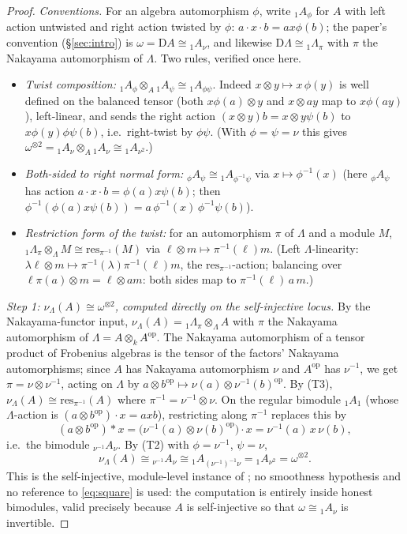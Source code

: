 \documentclass[11pt]{amsart}
\theoremstyle{definition}
\newcommand{\D}{\mathrm{D}}
\newcommand{\kk}{k}
\begin{document}
\begin{proof}
\emph{Conventions.} For an algebra automorphism $\phi$, write ${}_1A_\phi$ for
$A$ with left action untwisted and right action twisted by $\phi$:
$a\cdot x\cdot b=ax\phi(b)$; the paper's convention (\S\ref{sec:intro}) is
$\omega=\D A\cong{}_1A_\nu$, and likewise $\D\Lambda\cong{}_1\Lambda_\pi$ with
$\pi$ the Nakayama automorphism of $\Lambda$. Two rules, verified once here.
\begin{itemize}
\item[\textup{(T1)}] \emph{Twist composition:}
${}_1A_\phi\otimes_A{}_1A_\psi\cong{}_1A_{\phi\psi}$. Indeed
$x\otimes y\mapsto x\,\phi(y)$ is well defined on the balanced tensor
(both $x\phi(a)\otimes y$ and $x\otimes ay$ map to $x\phi(ay)$),
left-linear, and sends the right action $(x\otimes y)b=x\otimes y\psi(b)$ to
$x\phi(y)\phi\psi(b)$, i.e.\ right-twist by $\phi\psi$. (With $\phi=\psi=\nu$
this gives $\omega^{\otimes2}={}_1A_\nu\otimes_A{}_1A_\nu\cong{}_1A_{\nu^2}$.)
\item[\textup{(T2)}] \emph{Both-sided to right normal form:}
${}_\phi A_\psi\cong{}_1A_{\phi^{-1}\psi}$ via $x\mapsto\phi^{-1}(x)$
(here ${}_\phi A_\psi$ has action $a\cdot x\cdot b=\phi(a)x\psi(b)$; then
$\phi^{-1}(\phi(a)x\psi(b))=a\,\phi^{-1}(x)\,\phi^{-1}\psi(b)$).
\item[\textup{(T3)}] \emph{Restriction form of the twist:} for an automorphism
$\pi$ of $\Lambda$ and a module $M$, ${}_1\Lambda_\pi\otimes_\Lambda M\cong
\mathrm{res}_{\pi^{-1}}(M)$ via $\ell\otimes m\mapsto\pi^{-1}(\ell)m$. (Left
$\Lambda$-linearity: $\lambda\ell\otimes m\mapsto\pi^{-1}(\lambda)\pi^{-1}(\ell)m$,
the $\mathrm{res}_{\pi^{-1}}$-action; balancing over $\ell\pi(a)\otimes m=
\ell\otimes am$: both sides map to $\pi^{-1}(\ell)\,a\,m$.)
\end{itemize}

\emph{Step 1: $\nu_\Lambda(A)\cong\omega^{\otimes2}$, computed directly on the
self-injective locus.} By the Nakayama-functor input,
$\nu_\Lambda(A)={}_1\Lambda_\pi\otimes_\Lambda A$ with $\pi$ the Nakayama
automorphism of $\Lambda=A\otimes_\kk A^{\mathrm{op}}$. The Nakayama
automorphism of a tensor product of Frobenius algebras is the tensor of the
factors' Nakayama automorphisms; since $A$ has Nakayama automorphism $\nu$ and
$A^{\mathrm{op}}$ has $\nu^{-1}$, we get $\pi=\nu\otimes\nu^{-1}$, acting on
$\Lambda$ by $a\otimes b^{\mathrm{op}}\mapsto\nu(a)\otimes\nu^{-1}(b)^{\mathrm{op}}$.
By (T3), $\nu_\Lambda(A)\cong\mathrm{res}_{\pi^{-1}}(A)$ where
$\pi^{-1}=\nu^{-1}\otimes\nu$. On the regular bimodule ${}_1A_1$ (whose
$\Lambda$-action is $(a\otimes b^{\mathrm{op}})\cdot x=axb$), restricting along
$\pi^{-1}$ replaces this by
\[
(a\otimes b^{\mathrm{op}})\ast x
=\bigl(\nu^{-1}(a)\otimes\nu(b)^{\mathrm{op}}\bigr)\cdot x
=\nu^{-1}(a)\,x\,\nu(b),
\]
i.e.\ the bimodule ${}_{\nu^{-1}}A_{\nu}$. By (T2) with $\phi=\nu^{-1}$,
$\psi=\nu$,
\[
\nu_\Lambda(A)\cong{}_{\nu^{-1}}A_{\nu}\cong{}_1A_{(\nu^{-1})^{-1}\nu}
={}_1A_{\nu^2}=\omega^{\otimes2}.
\]
This is the self-injective, module-level instance of \cite[Theorem 3.2(4)]{ArmTau};
no smoothness hypothesis and no reference to \eqref{eq:square} is used: the
computation is entirely inside honest bimodules, valid precisely because $A$ is
self-injective so that $\omega\cong{}_1A_\nu$ is invertible.


\end{proof}
\end{document}
